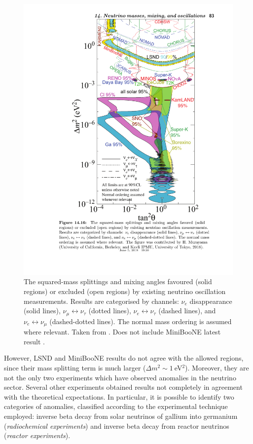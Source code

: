 \begin{figure}[htbp]
    \centering
    \includegraphics[width=0.7\linewidth]{figures/globalfit.pdf}
    \caption{The squared-mass splittings and mixing angles favoured (solid regions) or excluded (open regions) by existing neutrino oscillation measurements. Results are categorised by channels: $\nu_e$ disappearance (solid lines), $\nu_{\mu} \leftrightarrow \nu_{\tau}$  (dotted lines), $\nu_{e} \leftrightarrow \nu_{\tau}$ (dashed lines), and $\nu_{e} \leftrightarrow \nu_{\mu}$ (dashed-dotted lines). The normal mass ordering is assumed where relevant. Taken from \cite{PhysRevD.98.030001}. Does not include MiniBooNE latest result \cite{Aguilar-Arevalo:2018gpe}.}
    \label{fig:globalfit}
\end{figure}

However, LSND and MiniBooNE results do not agree with the allowed regions, since their mass splitting term is much larger ($\Delta m^2 \sim 1~$eV$^2$). Moreover, they are not the only two experiments which have observed anomalies in the neutrino sector. Several other experiments obtained results not completely in agreement with the theoretical expectations. In particular, it is possible to identify two categories of anomalies, classified according to the experimental technique employed: inverse beta decay from solar neutrinos of gallium into germanium (\emph{radiochemical experiments}) and inverse beta decay from reactor neutrinos (\emph{reactor experiments}).

